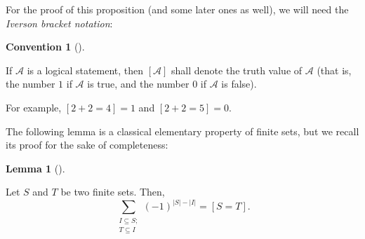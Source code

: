 \documentclass[numbers=enddot,12pt,final,onecolumn,notitlepage]{scrartcl}%
\theoremstyle{definition}
\newtheorem{lem}[theo]{Lemma}
\newenvironment{lemma}[1][]
{\begin{lem}[#1]\begin{leftbar}}
{\end{leftbar}\end{lem}}
\newtheorem{conv}[theo]{Convention}
\newenvironment{convention}[1][]
{\begin{conv}[#1]\begin{leftbar}}
{\end{leftbar}\end{conv}}
\let\sumnonlimits\sum
\renewcommand{\sum}{\sumnonlimits\limits}
\begin{document}
For the proof of this proposition (and some later ones as well), we will need
the \emph{Iverson bracket notation}:

\begin{convention}
\label{conv.iverson}If $\mathcal{A}$ is a logical statement, then $\left[
\mathcal{A}\right]  $ shall denote the truth value of $\mathcal{A}$ (that is,
the number $1$ if $\mathcal{A}$ is true, and the number $0$ if $\mathcal{A}$
is false).
\end{convention}

For example, $\left[  2+2=4\right]  =1$ and $\left[  2+2=5\right]  =0$.

The following lemma is a classical elementary property of finite sets, but we
recall its proof for the sake of completeness:

\begin{lemma}
\label{lem.altsum.1}Let $S$ and $T$ be two finite sets. Then,%
\[
\sum_{\substack{I\subseteq S;\\T\subseteq I}}\left(  -1\right)  ^{\left\vert
S\right\vert -\left\vert I\right\vert }=\left[  S=T\right]  .
\]

\end{lemma}
\end{document}

